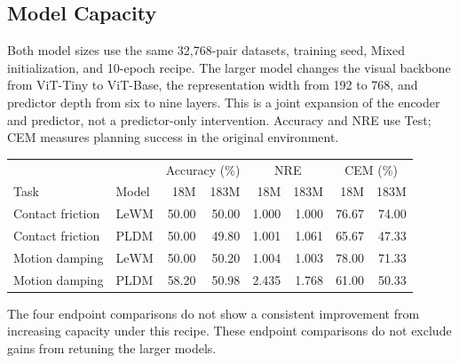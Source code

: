\subsection{Model Capacity}
\label{app:model-capacity}
Both model sizes use the same 32,768-pair datasets, training seed, Mixed initialization, and 10-epoch recipe.
The larger model changes the visual backbone from ViT-Tiny to ViT-Base, the representation width from 192 to 768, and predictor depth from six to nine layers.
This is a joint expansion of the encoder and predictor, not a predictor-only intervention.
Accuracy and NRE use Test; CEM measures planning success in the original environment.
\begin{center}\small
\begin{tabular}{@{}llrrrrrr@{}}
\toprule
& & \multicolumn{2}{c}{Accuracy (\%)} & \multicolumn{2}{c}{NRE} & \multicolumn{2}{c}{CEM (\%)}\\
Task & Model & 18M & 183M & 18M & 183M & 18M & 183M\\
\midrule
Contact friction & LeWM & 50.00 & 50.00 & 1.000 & 1.000 & 76.67 & 74.00 \\
Contact friction & PLDM & 50.00 & 49.80 & 1.001 & 1.061 & 65.67 & 47.33 \\
Motion damping & LeWM & 50.00 & 50.20 & 1.004 & 1.003 & 78.00 & 71.33 \\
Motion damping & PLDM & 58.20 & 50.98 & 2.435 & 1.768 & 61.00 & 50.33 \\
\bottomrule\end{tabular}\end{center}
The four endpoint comparisons do not show a consistent improvement from increasing capacity under this recipe.
These endpoint comparisons do not exclude gains from retuning the larger models.

